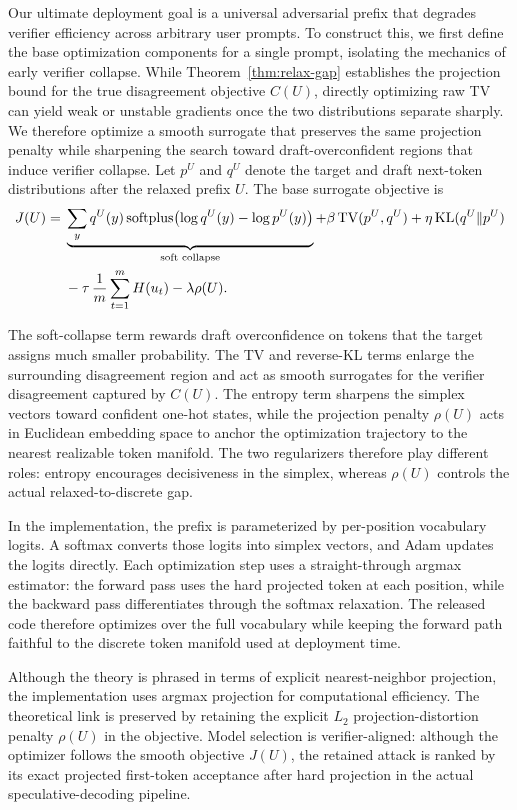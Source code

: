 Our ultimate deployment goal is a universal adversarial prefix that degrades
verifier efficiency across arbitrary user prompts. To construct this, we first
define the base optimization components for a single prompt, isolating the
mechanics of early verifier collapse. While
Theorem~\ref{thm:relax-gap} establishes the projection bound for the true
disagreement objective $C(U)$, directly optimizing raw TV can yield weak or
unstable gradients once the two distributions separate sharply. We therefore
optimize a smooth surrogate that preserves the same projection penalty while
sharpening the search toward draft-overconfident regions that induce verifier
collapse. Let $p^U$ and $q^U$ denote the target and draft next-token
distributions after the relaxed prefix $U$. The base surrogate objective is
\begin{align*}
J(U) ={}&
\underbrace{\sum_{y} q^U(y)\,\mathrm{softplus}\!\left(\log q^U(y)-\log p^U(y)\right)}_{\text{soft collapse}}
+ \beta \,\mathrm{TV}(p^U, q^U)
+ \eta \,\mathrm{KL}(q^U \Vert p^U) \\
&- \tau \,\frac{1}{m}\sum_{t=1}^{m} H(u_t)
- \lambda\rho(U).
\end{align*}

The soft-collapse term rewards draft overconfidence on tokens that the target
assigns much smaller probability. The TV and reverse-KL terms enlarge the
surrounding disagreement region and act as smooth surrogates for the verifier
disagreement captured by $C(U)$. The entropy term sharpens the simplex vectors
toward confident one-hot states, while the projection penalty $\rho(U)$ acts
in Euclidean embedding space to anchor the optimization trajectory to the
nearest realizable token manifold. The two regularizers therefore play
different roles: entropy encourages decisiveness in the simplex, whereas
$\rho(U)$ controls the actual relaxed-to-discrete gap.

In the implementation, the prefix is parameterized by per-position vocabulary
logits. A softmax converts those logits into simplex vectors, and Adam updates
the logits directly. Each optimization step uses a straight-through argmax
estimator: the forward pass uses the hard projected token at each position,
while the backward pass differentiates through the softmax relaxation. The
released code therefore optimizes over the full vocabulary while keeping the
forward path faithful to the discrete token manifold used at deployment time.

Although the theory is phrased in terms of explicit nearest-neighbor
projection, the implementation uses argmax projection for computational
efficiency. The theoretical link is preserved by retaining the explicit
$L_2$ projection-distortion penalty $\rho(U)$ in the objective. Model
selection is verifier-aligned: although the optimizer follows the smooth
objective $J(U)$, the retained attack is ranked by its exact projected
first-token acceptance after hard projection in the actual
speculative-decoding pipeline.

